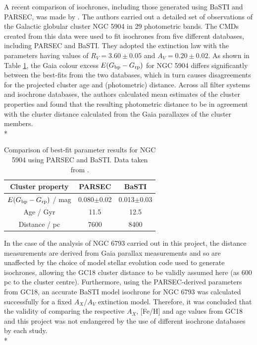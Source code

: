 \documentclass[12pt, a4paper]{report}
\begin{document}
A recent comparison of isochrones, including those generated using BaSTI and PARSEC, was made by \cite{2019MNRAS.483.4949G}. The authors carried out a detailed set of observations of the Galactic globular cluster NGC 5904 in 29 photometric bands. The CMDs created from this data were used to fit isochrones from five different databases, including PARSEC and BaSTI. They adopted the \cite{1989ApJ...345..245C} extinction law with the parameters having values of $R_{V} = 3.60\pm0.05$ and $A_{V} = 0.20\pm0.02$. As shown in Table \ref{NGC5904_obs_gontcharov}, the Gaia colour excess $E(G_{\textnormal{bp}} - G_{\textnormal{rp}})$ for NGC 5904 differs significantly between the best-fits from the two databases, which in turn causes disagreements for the projected cluster age and (photometric) distance. Across all filter systems and isochrone databases, the authors calculated mean estimates of the cluster properties and found that the resulting photometric distance to be in agreement with the cluster distance calculated from the Gaia parallaxes of the cluster members.\\*

\begin{table}
\begin{center}
\begin{tabular}{ccc}
\hline
Cluster property & PARSEC & BaSTI \\
\hline
$E(G_{\textnormal{bp}} - G_{\textnormal{rp}})$ / mag & 0.080$\pm$0.02 & 0.013$\pm$0.03 \\
Age / Gyr & 11.5 & 12.5 \\
Distance / pc & 7600 & 8400 \\
\hline
\end{tabular}
\caption{Comparison of best-fit parameter results for NGC 5904 using PARSEC and BaSTI. Data taken from \cite{2019MNRAS.483.4949G}.}
\label{NGC5904_obs_gontcharov}
\end{center}
\end{table}

In the case of the analysis of NGC 6793 carried out in this project, the distance measurements are derived from Gaia parallax measurements and so are unaffected by the choice of model stellar evolution code used to generate isochrones, allowing the GC18 cluster distance to be validly assumed here (as 600 pc to the cluster centre). Furthermore, using the PARSEC-derived parameters from GC18, an accurate BaSTI model isochrone for NGC 6793 was calculated successfully for a fixed $A_{X}/A_{V}$ extinction model. Therefore, it was concluded that the validity of comparing the respective $A_{X}$, [Fe/H] and age values from GC18 and this project was not endangered by the use of different isochrone databases by each study.\\*
\end{document}
